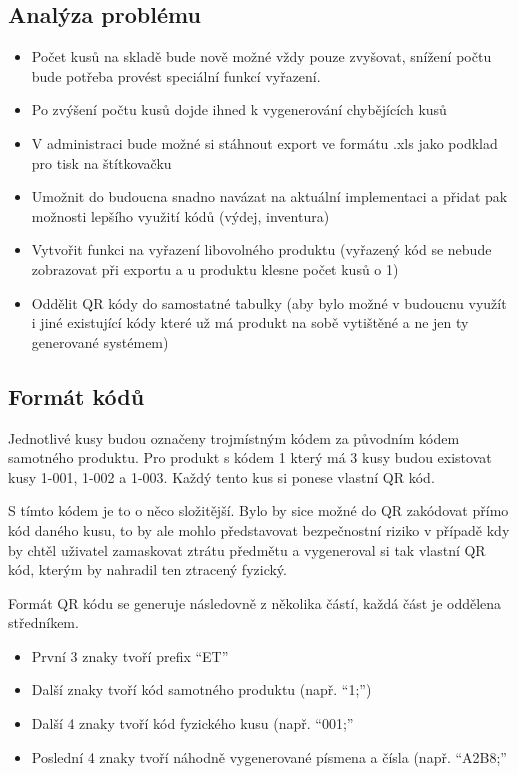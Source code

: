 \subsection{Analýza problému}

\begin{itemize}
    \item Počet kusů na skladě bude nově možné vždy pouze zvyšovat, snížení počtu bude potřeba provést speciální funkcí vyřazení.
    \item Po zvýšení počtu kusů dojde ihned k vygenerování chybějících kusů
    \item V administraci bude možné si stáhnout export ve formátu .xls jako podklad pro tisk na štítkovačku
    \item Umožnit do budoucna snadno navázat na aktuální implementaci a přidat pak možnosti lepšího využití kódů (výdej, inventura)
    \item Vytvořit funkci na vyřazení libovolného produktu (vyřazený kód se nebude zobrazovat při exportu a u produktu klesne počet kusů o 1)
    \item Oddělit QR kódy do samostatné tabulky (aby bylo možné v budoucnu využít i jiné existující kódy které už má produkt na sobě vytištěné a ne jen ty generované systémem)
\end{itemize}

\subsection{Formát kódů}

Jednotlivé kusy budou označeny trojmístným kódem za původním kódem samotného produktu. Pro produkt s kódem 1 který má 3 kusy budou existovat kusy 1-001, 1-002 a 1-003. Každý tento kus si ponese vlastní QR kód.

S tímto kódem je to o něco složitější. Bylo by sice možné do QR zakódovat přímo kód daného kusu, to by ale mohlo představovat bezpečnostní riziko v případě kdy by chtěl uživatel zamaskovat ztrátu předmětu a vygeneroval si tak vlastní QR kód, kterým by nahradil ten ztracený fyzický. 

Formát QR kódu se generuje následovně z několika částí, každá část je oddělena středníkem.

\begin{itemize}
    \item První 3 znaky tvoří prefix \enquote{ET\;}
    \item Další znaky tvoří kód samotného produktu (např.  \enquote{1;}) 
    \item Další 4 znaky tvoří kód fyzického kusu (např. \enquote{001;}
    \item Poslední 4 znaky tvoří náhodně vygenerované písmena a čísla (např. \enquote{A2B8;}
\end{itemize}

